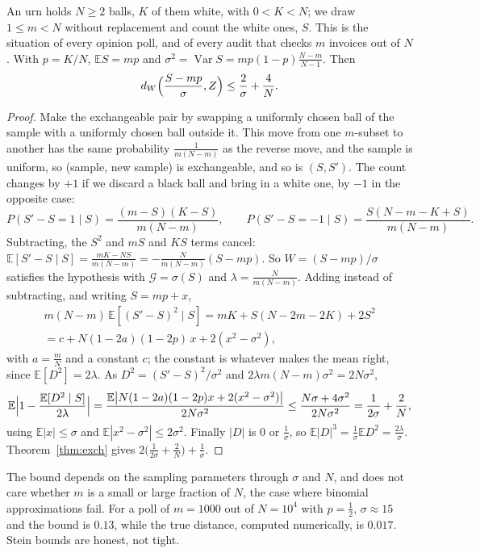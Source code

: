 \begin{example}\label{ex:hypergeom}
An urn holds $N\ge2$ balls, $K$ of them white, with $0<K<N$; we draw $1\le m<N$ without replacement and count the white ones, $S$. This is the situation of every opinion poll, and of
every audit that checks $m$ invoices out of $N$. With $p=K/N$, $\mathbb ES=mp$ and $\sigma^2=\operatorname{Var}S=mp(1-p)\frac{N-m}{N-1}$. Then
\[
d_W\Bigl(\frac{S-mp}\sigma,Z\Bigr)\le\frac2\sigma+\frac4N.
\]
\end{example}
\begin{proof}
Make the exchangeable pair by swapping a uniformly chosen ball of the sample with a uniformly chosen ball outside it. This move from one $m$-subset to
another has the same probability $\frac1{m(N-m)}$ as the reverse move, and the sample is uniform, so (sample, new sample) is exchangeable, and so is $(S,S')$.
The count changes by $+1$ if we discard a black ball and bring in a white one, by $-1$ in the opposite case:
\[
P(S'-S=1\mid S)=\frac{(m-S)(K-S)}{m(N-m)},\qquad P(S'-S=-1\mid S)=\frac{S(N-m-K+S)}{m(N-m)}.
\]
Subtracting, the $S^2$ and $mS$ and $KS$ terms cancel: $\mathbb E[S'-S\mid S]=\frac{mK-NS}{m(N-m)}=-\frac N{m(N-m)}(S-mp)$. So
$W=(S-mp)/\sigma$ satisfies the hypothesis with $\mathcal G=\sigma(S)$ and $\lambda=\frac N{m(N-m)}$. Adding instead of subtracting, and writing $S=mp+x$,
\[
\begin{gathered}
m(N-m)\,\mathbb E[(S'-S)^2\mid S]=mK+S(N-2m-2K)+2S^2\\=c+N(1-2a)(1-2p)\,x+2(x^2-\sigma^2),
\end{gathered}
\]
with $a=\frac mN$ and a constant $c$; the constant is whatever makes the mean right, since $\mathbb E[D^2]=2\lambda$. As $D^2=(S'-S)^2/\sigma^2$ and $2\lambda m(N-m)\sigma^2=2N\sigma^2$,
\[
\mathbb E\Bigl|1-\frac{\mathbb E[D^2\mid S]}{2\lambda}\Bigr|=\frac{\mathbb E\bigl|N(1-2a)(1-2p)x+2(x^2-\sigma^2)\bigr|}{2N\sigma^2}\le\frac{N\sigma+4\sigma^2}{2N\sigma^2}=\frac1{2\sigma}+\frac2N,
\]
using $\mathbb E|x|\le\sigma$ and $\mathbb E|x^2-\sigma^2|\le2\sigma^2$. Finally $|D|$ is $0$ or $\frac1\sigma$, so $\mathbb E|D|^3=\frac1\sigma\mathbb ED^2=\frac{2\lambda}\sigma$.
Theorem~\ref{thm:exch} gives $2\bigl(\frac1{2\sigma}+\frac2N\bigr)+\frac1\sigma$.
\end{proof}

The bound depends on the sampling parameters through $\sigma$ and $N$, and does not care whether $m$ is a small or large fraction of $N$, the case where binomial
approximations fail. For a poll of $m=1000$ out of $N=10^4$ with $p=\frac12$, $\sigma\approx15$ and the bound is $0.13$, while the true distance, computed numerically, is $0.017$. Stein bounds are honest, not tight.

